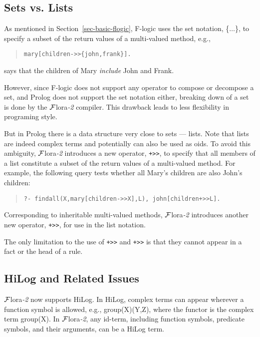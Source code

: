 \documentclass[11pt]{article}
\newcommand{\FLORA}{{\mbox{${\cal F}${\sc lora}\rm\emph{-2}}}\xspace}
\newcommand{\fl}{\mbox{F-logic}\xspace}
\begin{document}
\subsection {Sets vs. Lists}


%
As mentioned in Section~\ref{sec-basic-flogic}, \fl uses the set
notation, \{$\ldots$\}, to specify a subset of the return values of a
multi-valued method, e.g.,
\begin{quote}
\verb|mary[children->>{john,frank}].|
\end{quote}
says that the children of {\sf Mary} \emph{include} {\sf John} and
{\sf Frank}.

However, since \fl does not support any operator to compose or
decompose a set, and Prolog does not support the set notation either,
breaking down of a set is done by the \FLORA compiler. This drawback
leads to less flexibility in programing style.

%
But in Prolog there is a data structure very close to sets --- lists.
Note that lists are indeed complex terms and potentially can also be
used as oids. To avoid this ambiguity, \FLORA introduces a new
operator, {\tt +>>}, to specify that all members of a list constitute
a subset of the return values of a multi-valued method. For example,
the following query tests whether all {\sf Mary}'s children are also
{\sf John}'s children:
\begin{quote}
\begin{verbatim}
?- findall(X,mary[children->>X],L), john[children+>>L].
\end{verbatim}
\end{quote}

Corresponding to inheritable multi-valued methods, \FLORA introduces
another new operator, {\tt *+>>}, for use in the list notation.

The only limitation to the use of {\tt +>>} and {\tt *+>>} is that
they cannot appear in a fact or the head of a rule.


\subsection{HiLog and Related Issues} \label{sec:hilog}


%
\FLORA now supports HiLog. In HiLog, complex terms can appear wherever
a function symbol is allowed, e.g., {\sf group(X)(Y,Z)}, where the
functor is the complex term {\sf group(X)}. In \FLORA, any id-term,
including function symbols, predicate symbols, and their arguments,
can be a HiLog term.
\end{document}
